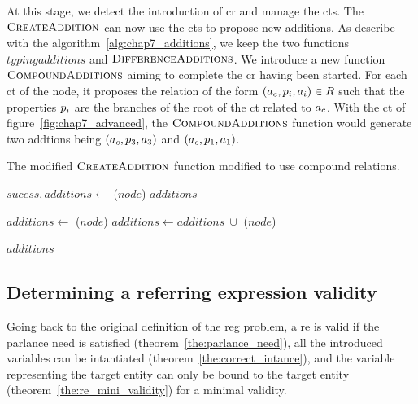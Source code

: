 At this stage, we detect the introduction of \acrshort{cr} and manage the \acrshort{ct}s. The $\textsc{CreateAddition}$ can now use the \acrshort{ct}s to propose new additions. As describe with the algorithm~\ref{alg:chap7_additions}, we keep the two functions $typingadditions$ and $\textsc{DifferenceAdditions}$. We introduce a new function $\textsc{CompoundAdditions}$ aiming to complete the \acrshort{cr} having been started. For each \acrshort{ct} of the node, it proposes the relation of the form $(a_c, p_i, a_i) \in R$ such that the properties $p_i$ are the branches of the root of the \acrshort{ct} related to $a_c$. With the  \acrshort{ct} of figure~\ref{fig:chap7_advanced}, the $\textsc{CompoundAdditions}$ function would generate two addtions being $(a_c, p_3, a_3)$ and $(a_c, p_1, a_1)$.

\begin{algorithm}[ht!]
\caption{\label{alg:chap7_additions} The modified $\textsc{CreateAddition}$ function modified to use compound relations. }

\begin{algorithmic}

        \State $sucess, additions\leftarrow$ \typingadditions($node$)
            \Return $additions$
        \EndIf
        
        \State $additions\leftarrow$ \compoundadditions($node$) 
        \State $additions\leftarrow additions\ \cup$ \differenceadditions($node$) 
        
        \Return $additions$
    \EndFunction
    
\end{algorithmic}
\end{algorithm}

\subsection{Determining a referring expression validity}

Going back to the original definition of the \acrshort{reg} problem, a \acrshort{re} is valid if the parlance need is satisfied (theorem~\ref{the:parlance_need}), all the introduced variables can be intantiated (theorem~\ref{the:correct_intance}), and the variable representing the target entity can only be bound to the target entity (theorem~\ref{the:re_mini_validity}) for a minimal validity.

